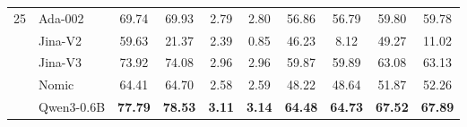 \begin{table}[htbp!]
\begin{tabular}{llcccccccc}
\midrule
\multirow{5}{*}{25} & Ada-002 & 69.74 & 69.93 & 2.79 & 2.80 & 56.86 & 56.79 & 59.80 & 59.78 \\
& Jina-V2 & 59.63 & 21.37 & 2.39 & 0.85 & 46.23 & 8.12 & 49.27 & 11.02 \\
& Jina-V3 & 73.92 & 74.08 & 2.96 & 2.96 & 59.87 & 59.89 & 63.08 & 63.13 \\
& Nomic & 64.41 & 64.70 & 2.58 & 2.59 & 48.22 & 48.64 & 51.87 & 52.26 \\
& Qwen3-0.6B & \textbf{77.79} & \textbf{78.53} & \textbf{3.11} & \textbf{3.14} & \textbf{64.48} & \textbf{64.73} & \textbf{67.52} & \textbf{67.89} \\
\bottomrule
\end{tabular}
\end{table}